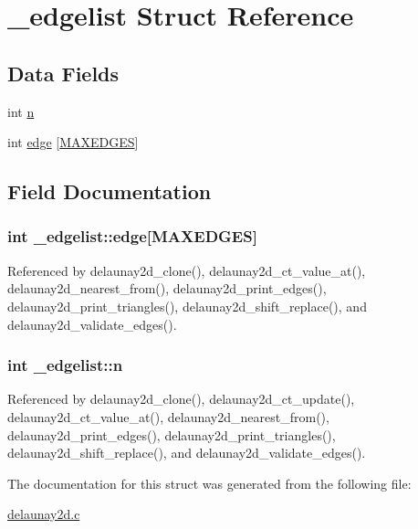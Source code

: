 \hypertarget{struct__edgelist}{}\section{\+\_\+edgelist Struct Reference}
\label{struct__edgelist}
\subsection*{Data Fields}
\begin{DoxyCompactItemize}
\item 
int \hyperlink{struct__edgelist_af38b1dcbb0d4720a5605fec4d401ae0d}{n}
\item 
int \hyperlink{struct__edgelist_a458aee2939e1e519bfe94228bcdd37df}{edge} \mbox{[}\hyperlink{delaunay2d_8c_a7858acc99855a4aac8d78bf22f709b1f}{M\+A\+X\+E\+D\+G\+ES}\mbox{]}
\end{DoxyCompactItemize}


\subsection{Field Documentation}
\subsubsection[{\texorpdfstring{edge}{edge}}]{\setlength{\rightskip}{0pt plus 5cm}int \+\_\+edgelist\+::edge\mbox{[}{\bf M\+A\+X\+E\+D\+G\+ES}\mbox{]}}\hypertarget{struct__edgelist_a458aee2939e1e519bfe94228bcdd37df}{}\label{struct__edgelist_a458aee2939e1e519bfe94228bcdd37df}


Referenced by delaunay2d\+\_\+clone(), delaunay2d\+\_\+ct\+\_\+value\+\_\+at(), delaunay2d\+\_\+nearest\+\_\+from(), delaunay2d\+\_\+print\+\_\+edges(), delaunay2d\+\_\+print\+\_\+triangles(), delaunay2d\+\_\+shift\+\_\+replace(), and delaunay2d\+\_\+validate\+\_\+edges().

\subsubsection[{\texorpdfstring{n}{n}}]{\setlength{\rightskip}{0pt plus 5cm}int \+\_\+edgelist\+::n}\hypertarget{struct__edgelist_af38b1dcbb0d4720a5605fec4d401ae0d}{}\label{struct__edgelist_af38b1dcbb0d4720a5605fec4d401ae0d}


Referenced by delaunay2d\+\_\+clone(), delaunay2d\+\_\+ct\+\_\+update(), delaunay2d\+\_\+ct\+\_\+value\+\_\+at(), delaunay2d\+\_\+nearest\+\_\+from(), delaunay2d\+\_\+print\+\_\+edges(), delaunay2d\+\_\+print\+\_\+triangles(), delaunay2d\+\_\+shift\+\_\+replace(), and delaunay2d\+\_\+validate\+\_\+edges().



The documentation for this struct was generated from the following file\+:\begin{DoxyCompactItemize}
\item 
\hyperlink{delaunay2d_8c}{delaunay2d.\+c}\end{DoxyCompactItemize}
